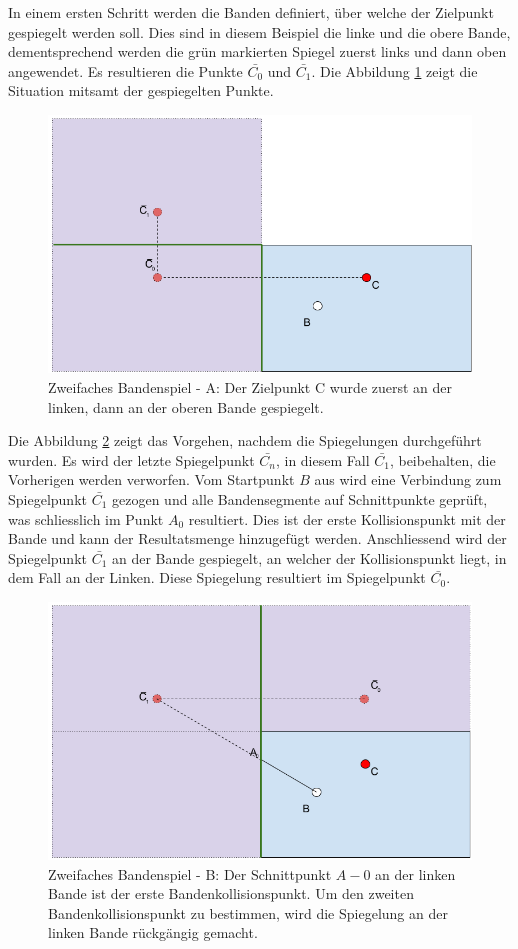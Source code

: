 In einem ersten Schritt werden die Banden definiert, über welche der Zielpunkt gespiegelt werden soll. Dies sind in
diesem Beispiel die linke und die obere Bande, dementsprechend werden die grün markierten Spiegel zuerst links und
dann oben angewendet. Es resultieren die Punkte $\bar{C_0}$ und $\bar{C_1}$. Die Abbildung \ref{fig:zweifaches_bandenspiel_a} zeigt die
Situation mitsamt der gespiegelten Punkte.
\begin{figure}[h]
    \begin{center}
        \includegraphics[width=0.5\linewidth]{../common/03_billiard_ai/resources/50_rail_reflection_2_a.png}
    \end{center}
    \caption{Zweifaches Bandenspiel - A: Der Zielpunkt C wurde zuerst an der linken, dann an der oberen Bande gespiegelt.}
    \label{fig:zweifaches_bandenspiel_a}
\end{figure}

Die Abbildung \ref{fig:zweifaches_bandenspiel_b} zeigt das Vorgehen, nachdem die Spiegelungen durchgeführt wurden.
Es wird der letzte Spiegelpunkt $\bar{C_n}$, in diesem Fall $\bar{C_1}$,
beibehalten, die Vorherigen werden verworfen. Vom Startpunkt $B$ aus wird eine Verbindung zum Spiegelpunkt $\bar{C_1}$
gezogen und alle Bandensegmente auf Schnittpunkte geprüft, was schliesslich im Punkt $A_0$ resultiert. Dies ist
der erste Kollisionspunkt mit der Bande und kann der Resultatsmenge hinzugefügt werden. Anschliessend wird der Spiegelpunkt
$\bar{C_1}$ an der Bande gespiegelt, an welcher der Kollisionspunkt liegt, in dem Fall an der Linken. Diese Spiegelung
resultiert im Spiegelpunkt $\bar{C_0}$.
\begin{figure}[h]
    \begin{center}
        \includegraphics[width=0.5\linewidth]{../common/03_billiard_ai/resources/51_rail_reflection_2_b.png}
    \end{center}
    \caption{Zweifaches Bandenspiel - B: Der Schnittpunkt $A-0$ an der linken Bande ist der erste Bandenkollisionspunkt.
    Um den zweiten Bandenkollisionspunkt zu bestimmen, wird die Spiegelung an der linken Bande rückgängig gemacht.}
    \label{fig:zweifaches_bandenspiel_b}
\end{figure}

